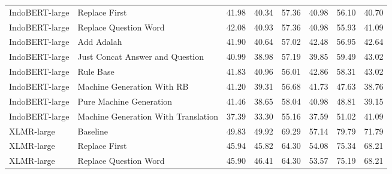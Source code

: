 \begin{table}[H]
\begin{tabular}{llrrrrrr}
IndoBERT-large &                       Replace First &                  41.98 &                  40.34 &                  57.36 &                  40.98 &                  56.10 &                  40.70 \\
IndoBERT-large &               Replace Question Word &                  42.08 &                  40.93 &                  57.36 &                  40.98 &                  55.93 &                  41.09 \\
IndoBERT-large &                          Add Adalah &                  41.90 &                  40.64 &                  57.02 &                  42.48 &                  56.95 &                  42.64 \\
IndoBERT-large &     Just Concat Answer and Question &                  40.99 &                  38.98 &                  57.19 &                  39.85 &                  59.49 &                  43.02 \\
IndoBERT-large &                           Rule Base &                  41.83 &                  40.96 &                  56.01 &                  42.86 &                  58.31 &                  43.02 \\
IndoBERT-large &          Machine Generation With RB &                  41.20 &                  39.31 &                  56.68 &                  41.73 &                  47.63 &                  38.76 \\
IndoBERT-large &             Pure Machine Generation &                  41.46 &                  38.65 &                  58.04 &                  40.98 &                  48.81 &                  39.15 \\
IndoBERT-large & Machine Generation With Translation &                  37.39 &                  33.30 &                  55.16 &                  37.59 &                  51.02 &                  41.09 \\
\hline
    XLMR-large &                            Baseline &                  49.83 &                  49.92 &                  69.29 &                  57.14 &                  79.79 &                  71.79 \\
    XLMR-large &                       Replace First &                  45.94 &                  45.82 &                  64.30 &                  54.08 &                  75.34 &                  68.21 \\
    XLMR-large &               Replace Question Word &                  45.90 &                  46.41 &                  64.30 &                  53.57 &                  75.19 &                  68.21 \\

\end{tabular}
\end{table}
